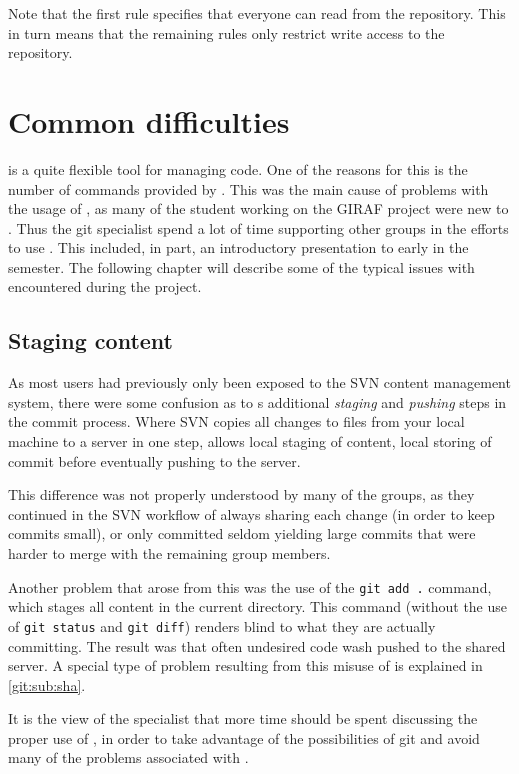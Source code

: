 Note that the first rule specifies that everyone can read from the repository.
This in turn means that the remaining rules only restrict write access to the repository.

\section{Common \git{} difficulties}
\Git{} is a quite flexible tool for managing code.
One of the reasons for this is the number of commands provided by \git{}.
This was the main cause of problems with the usage of \git{}, as many of the student working on the GIRAF project were new to \git{}.
Thus the git specialist spend a lot of time supporting other groups in the efforts to use \git{}.
This included, in part, an introductory presentation to \git{} early in the semester.
The following chapter will describe some of the typical issues with \git{} encountered during the project.

\subsection{Staging content}
As most users had previously only been exposed to the SVN content management system, there were some confusion as to \git{}s additional \textit{staging} and \textit{pushing} steps in the commit process.
Where SVN copies all changes to files from your local machine to a server in one step, \git{} allows local staging of content, local storing of commit before eventually pushing to the server.

This difference was not properly understood by many of the groups, as they continued in the SVN workflow of always sharing each change (in order to keep commits small), or only committed seldom yielding large commits that were harder to merge with the remaining group members.

Another problem that arose from this was the use of the \texttt{git add .} command, which stages all content in the current directory.
This command (without the use of \texttt{git status} and \texttt{git diff}) renders \git{} blind to what they are actually committing.
The result was that often undesired code wash pushed to the shared server.
A special type of problem resulting from this misuse of \git{} is explained in \cref{git:sub:sha}.

It is the view of the \git{} specialist that more time should be spent discussing the proper use of \git{}, in order to take advantage of the possibilities of git and avoid many of the problems associated with \git{}.

